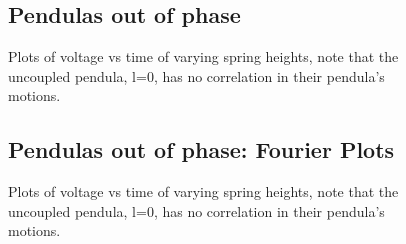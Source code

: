 \documentclass{article}
\begin{document}
\FloatBarrier

\begin{figure}[p]
\subsection{Pendulas out of phase}
    \centering
    \scalebox{0.52}{}
    \hspace{0.5cm}
    \scalebox{0.52}{}
  
    \vspace{0.5cm}
  
    \scalebox{0.52}{}
    \hspace{0.5cm}
    \scalebox{0.52}{}
  
    \vspace{0.5cm}
  
    \scalebox{0.52}{}
    \hspace{0.5cm}
    \scalebox{0.52}{}
  
    \caption{Plots of voltage vs time of varying spring heights, note 
    that the uncoupled pendula, l=0, has no correlation in their 
    pendula's motions.}
\end{figure}

\FloatBarrier

\begin{figure}[p]
\subsection{Pendulas out of phase: Fourier Plots}
    \centering
    \scalebox{0.52}{}
    \hspace{0.5cm}
    \scalebox{0.52}{}
  
    \vspace{0.5cm}
  
    \scalebox{0.52}{}
    \hspace{0.5cm}
    \scalebox{0.52}{}
  
    \vspace{0.5cm}
  
    \scalebox{0.52}{}
    \hspace{0.5cm}
    \scalebox{0.52}{}
  
    \caption{Plots of voltage vs time of varying spring heights, note 
    that the uncoupled pendula, l=0, has no correlation in their 
    pendula's motions.}
\end{figure}
\end{document}
